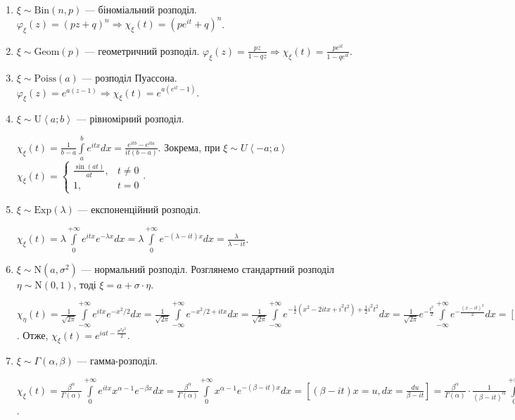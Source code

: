 \begin{enumerate}
    \item $\xi \sim \mathrm{Bin}(n,p)$ --- біноміальний розподіл.
    $\varphi_\xi(z) = (pz+q)^n \Rightarrow \chi_\xi(t) = \left( p e^{it} + q\right)^n$.
    \item $\xi \sim \mathrm{Geom}(p)$ --- геометричний розподіл.
    $\varphi_\xi(z) = \frac{pz}{1-qz} \Rightarrow \chi_\xi(t) = \frac{p e^{it}}{1-q e^{it}}$.
    \item $\xi \sim \mathrm{Poiss}(a)$ --- розподіл Пуассона.
    $\varphi_\xi(z) = e^{a(z-1)} \Rightarrow \chi_\xi(t) = e^{a(e^{it}-1)}$.
    \item $\xi \sim \mathrm{U}\left< a; b\right>$ --- рівномірний розподіл.

    $\chi_\xi(t) = \frac{1}{b-a} \int\limits_a^b e^{itx} dx = \frac{e^{itb} - e^{ita}}{it(b-a)}$.
    Зокрема, при $\xi \sim {U}\left< -a; a\right>$ $\chi_\xi(t) = \begin{cases}
        \frac{\sin(at)}{at}, & t \neq 0 \\
        1, & t = 0
    \end{cases}$.
    \item $\xi \sim \mathrm{Exp}(\lambda)$ --- експоненційний розподіл.
    
    $\chi_\xi(t) = \lambda \int\limits_0^{+\infty} e^{itx} e^{-\lambda x} dx = \lambda \int\limits_0^{+\infty} e^{-(\lambda-it)x} dx = \frac{\lambda}{\lambda - it}$.
    \item $\xi \sim \mathrm{N}(a, \sigma^2)$ --- нормальний розподіл. Розглянемо стандартний розподіл $\eta \sim \mathrm{N}(0, 1)$,
    тоді $\xi = a + \sigma\cdot\eta$.

    $\chi_\eta(t) = \frac{1}{\sqrt{2\pi}} \int\limits_{-\infty}^{+\infty} e^{itx} e^{-x^2/2} dx = 
    \frac{1}{\sqrt{2\pi}} \int\limits_{-\infty}^{+\infty} e^{-x^2/2 + itx} dx = 
    \frac{1}{\sqrt{2\pi}} \int\limits_{-\infty}^{+\infty} e^{-\frac{1}{2}(x^2 - 2itx + i^2t^2) + \frac{1}{2}i^2t^2} dx = 
    \frac{1}{\sqrt{2\pi}} e^{-\frac{t^2}{2}} \int\limits_{-\infty}^{+\infty} e^{-\frac{(x-it)^2}{2}} dx = 
    \left[ x+it = u, dx = du\right] = e^{-\frac{t^2}{2}}$.
    Отже, $\chi_\xi(t) = e^{iat - \frac{\sigma^2 t^2}{2}}$.
    \item $\xi \sim \Gamma(\alpha, \beta)$ --- гамма-розподіл.
    
    $\chi_\xi(t) = \frac{\beta^\alpha}{\Gamma(\alpha)} \int\limits_0^{+\infty} e^{itx} x^{\alpha-1} e^{-\beta x} dx =
    \frac{\beta^\alpha}{\Gamma(\alpha)} \int\limits_0^{+\infty} x^{\alpha-1} e^{-(\beta-it) x} dx = \left[ (\beta-it) x = u, dx = \frac{du}{\beta-it}\right] = 
    \frac{\beta^\alpha}{\Gamma(\alpha)} \cdot \frac{1}{(\beta-it)^\alpha} \int\limits_0^{+\infty} u^{\alpha-1} e^{-u} du = 
    \frac{\beta^\alpha}{\Gamma(\alpha)} \cdot \frac{1}{(\beta-it)^\alpha} \cdot \Gamma(\alpha) = (1-\frac{it}{\beta})^{-\alpha}$.
\end{enumerate}

